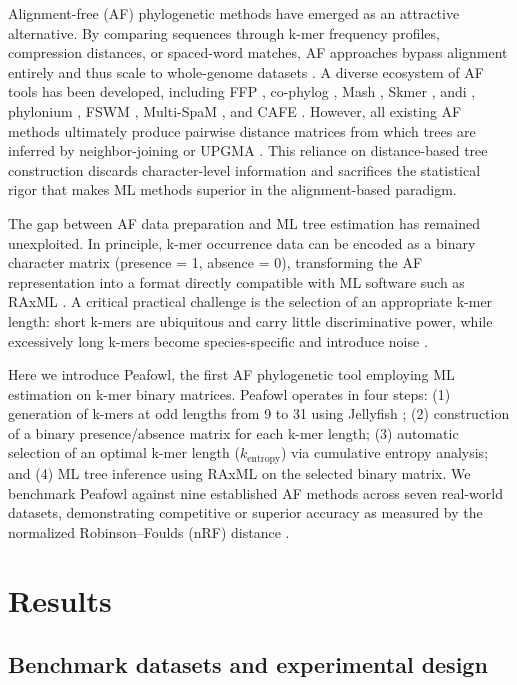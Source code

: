 \documentclass[11pt]{article}
\begin{document}
Alignment-free (AF) phylogenetic methods have emerged as an attractive alternative. By comparing sequences through k-mer frequency profiles, compression distances, or spaced-word matches, AF approaches bypass alignment entirely and thus scale to whole-genome datasets \citep{zielezinski2017, song2014}. A diverse ecosystem of AF tools has been developed, including FFP \citep{sims2009}, co-phylog \citep{yi2013}, Mash \citep{ondov2016}, Skmer \citep{sarmashghi2019}, andi \citep{haubold2015}, phylonium \citep{kloetzl2020}, FSWM \citep{leimeister2017}, Multi-SpaM \citep{dencker2020}, and CAFE \citep{lu2017}. However, all existing AF methods ultimately produce pairwise distance matrices from which trees are inferred by neighbor-joining or UPGMA \citep{saitou1987}. This reliance on distance-based tree construction discards character-level information and sacrifices the statistical rigor that makes ML methods superior in the alignment-based paradigm.

The gap between AF data preparation and ML tree estimation has remained unexploited. In principle, k-mer occurrence data can be encoded as a binary character matrix (presence = 1, absence = 0), transforming the AF representation into a format directly compatible with ML software such as RAxML \citep{stamatakis2014}. A critical practical challenge is the selection of an appropriate k-mer length: short k-mers are ubiquitous and carry little discriminative power, while excessively long k-mers become species-specific and introduce noise \citep{bernard2019, zielezinski2019}.

Here we introduce Peafowl, the first AF phylogenetic tool employing ML estimation on k-mer binary matrices. Peafowl operates in four steps: (1) generation of k-mers at odd lengths from 9 to 31 using Jellyfish \citep{marcais2011}; (2) construction of a binary presence/absence matrix for each k-mer length; (3) automatic selection of an optimal k-mer length ($k_{\text{entropy}}$) via cumulative entropy analysis; and (4) ML tree inference using RAxML on the selected binary matrix. We benchmark Peafowl against nine established AF methods across seven real-world datasets, demonstrating competitive or superior accuracy as measured by the normalized Robinson--Foulds (nRF) distance \citep{robinson1981}.

\section{Results}

\subsection{Benchmark datasets and experimental design}
\end{document}
